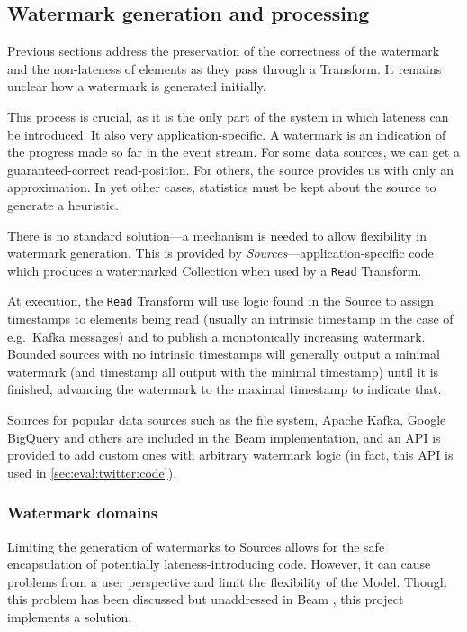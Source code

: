 \subsection{Watermark generation and processing}\label{sec:impl:dataflow:watermark-generation}


Previous sections address the preservation of the correctness of the watermark and the non-lateness of elements as they pass through a Transform.
It remains unclear how a watermark is generated initially.

This process is crucial, as it is the only part of the system in which lateness can be introduced.
It also very application-specific.
A watermark is an indication of the progress made so far in the event stream.
For some data sources, we can get a guaranteed-correct read-position.
For others, the source provides us with only an approximation.
In yet other cases, statistics must be kept about the source to generate a heuristic.

There is no standard solution---a mechanism is needed to allow flexibility in watermark generation.
This is provided by \emph{Sources}---application-specific code which produces a watermarked Collection when used by a \verb|Read| Transform.

At execution, the \verb|Read| Transform will use logic found in the Source to assign timestamps to elements being read (usually an intrinsic timestamp in the case of e.g.\ Kafka messages) and to publish a monotonically increasing watermark.
Bounded sources with no intrinsic timestamps will generally output a minimal watermark (and timestamp all output with the minimal timestamp) until it is finished, advancing the watermark to the maximal timestamp to indicate that.

Sources for popular data sources such as the file system, Apache Kafka, Google BigQuery and others are included in the Beam implementation, and an API \cite{BEAM-code-SourceAPI} is provided to add custom ones with arbitrary watermark logic (in fact, this API is used in \cref{sec:eval:twitter:code}).

\subsubsection{Watermark domains}

Limiting the generation of watermarks to Sources allows for the safe encapsulation of potentially lateness-introducing code.
However, it can cause problems from a user perspective and limit the flexibility of the Model.
Though this problem has been discussed but unaddressed in Beam \cite{Beam-JIRA-watermark-domains}, this project implements a solution.

